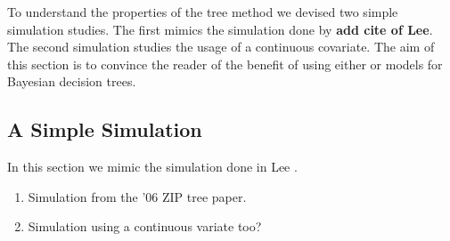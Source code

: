 

To understand the properties of the tree method we devised two simple simulation studies. The first mimics the simulation done by \textbf{add cite of Lee}. The second simulation studies the usage of a continuous covariate. The aim of this section is to convince the reader of the benefit of using either \ZIP or \ZINB models for Bayesian decision trees. 

\subsection{A Simple Simulation}

In this section we mimic the simulation done in Lee \cite{}. 

\begin{enumerate}
\item Simulation from the '06 ZIP tree paper. 
\item Simulation using a continuous variate too? 
\end{enumerate}


